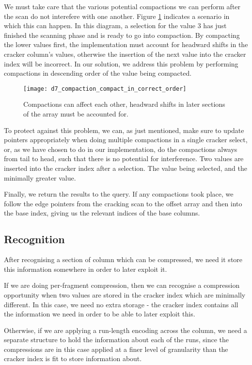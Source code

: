 We must take care that the various potential compactions we can perform after the scan do not interefere with one another. Figure \ref{fig:compact_in_correct_order} indicates a scenario in which this can happen. In this diagram, a selection for the value 3 has just finished the scanning phase and is ready to go into compaction. By compacting the lower values first, the implementation must account for headward shifts in the cracker column's values, otherwise the insertion of the next value into the cracker index will be incorrect. In our solution, we address this problem by performing compactions in descending order of the value being compacted.

\begin{figure}[H]
  \centering
  \texttt{[image: d7\_compaction\_compact\_in\_correct\_order]}
  \caption{Compactions can affect each other, headward shifts in later sections of the array must be accounted for.}
  \label{fig:compact_in_correct_order}
\end{figure}

To protect against this problem, we can, as just mentioned, make sure to update pointers appropriately when doing multiple compactions in a single cracker select, or, as we have chosen to do in our implementation, do the compactions always from tail to head, such that there is no potential for interference. Two values are inserted into the cracker index after a selection. The value being selected, and the minimally greater value.

Finally, we return the results to the query. If any compactions took place, we follow the edge pointers from the cracking scan to the offset array and then into the base index, giving us the relevant indices of the base columns.

\subsection{Recognition}

After recognising a section of column which can be compressed, we need it store this information somewhere in order to later exploit it.

If we are doing per-fragment compression, then we can recognise a compression opportunity when two values are stored in the cracker index which are minimally different. In this case, we need no extra storage - the cracker index contains all the information we need in order to be able to later exploit this.

Otherwise, if we are applying a run-length encoding across the column, we need a separate structure to hold the information about each of the runs, since the compressions are in this case applied at a finer level of granularity than the cracker index is fit to store information about.

